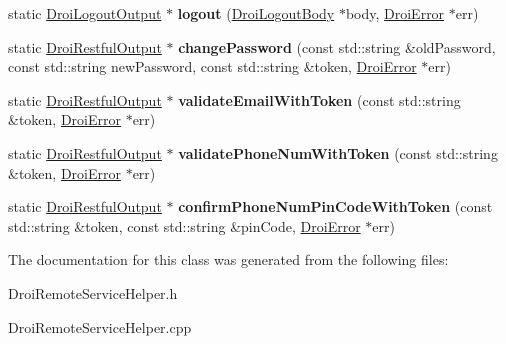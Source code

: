 \begin{DoxyCompactItemize}
\item 
\mbox{\label{class_droi_remote_service_helper_ac6c508e939cfa58f4eede724c45599f0}} 
static \hyperlink{class_droi_logout_output}{Droi\+Logout\+Output} $\ast$ {\bfseries logout} (\hyperlink{class_droi_logout_body}{Droi\+Logout\+Body} $\ast$body, \hyperlink{class_droi_error}{Droi\+Error} $\ast$err)
\item 
\mbox{\label{class_droi_remote_service_helper_a34fd2c0a1de12496177f52d659d83df3}} 
static \hyperlink{class_droi_restful_output}{Droi\+Restful\+Output} $\ast$ {\bfseries change\+Password} (const std\+::string \&old\+Password, const std\+::string new\+Password, const std\+::string \&token, \hyperlink{class_droi_error}{Droi\+Error} $\ast$err)
\item 
\mbox{\label{class_droi_remote_service_helper_adf8808ee2f4795d1c72b7b4cd07b05f5}} 
static \hyperlink{class_droi_restful_output}{Droi\+Restful\+Output} $\ast$ {\bfseries validate\+Email\+With\+Token} (const std\+::string \&token, \hyperlink{class_droi_error}{Droi\+Error} $\ast$err)
\item 
\mbox{\label{class_droi_remote_service_helper_a5e422041ad069c7d84d48eeff478ca64}} 
static \hyperlink{class_droi_restful_output}{Droi\+Restful\+Output} $\ast$ {\bfseries validate\+Phone\+Num\+With\+Token} (const std\+::string \&token, \hyperlink{class_droi_error}{Droi\+Error} $\ast$err)
\item 
\mbox{\label{class_droi_remote_service_helper_abdc6d6ed3a96d4b3e970644a2675e3e2}} 
static \hyperlink{class_droi_restful_output}{Droi\+Restful\+Output} $\ast$ {\bfseries confirm\+Phone\+Num\+Pin\+Code\+With\+Token} (const std\+::string \&token, const std\+::string \&pin\+Code, \hyperlink{class_droi_error}{Droi\+Error} $\ast$err)
\end{DoxyCompactItemize}


The documentation for this class was generated from the following files\+:\begin{DoxyCompactItemize}
\item 
Droi\+Remote\+Service\+Helper.\+h\item 
Droi\+Remote\+Service\+Helper.\+cpp\end{DoxyCompactItemize}
